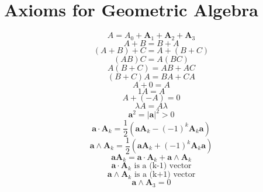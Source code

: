 \documentclass[11pt, a4paper, fleqn]{report}
\numberwithin{equation}{section}
\def\*#1{\mathbf{#1}}
\begin{document}
\section{Axioms for Geometric Algebra}
\begin{equation}
    A = A_0+\*A_1+\*A_2+\*A_3
\end{equation}
\begin{equation}
    A+B=B+A
\end{equation}
\begin{equation}
    (A+B)+C=A+(B+C)
\end{equation}
\begin{equation}
    (AB)C=A(BC)
\end{equation}
\begin{equation}
    A(B+C)=AB+AC
\end{equation}
\begin{equation}
    (B+C)A=BA+CA
\end{equation}
\begin{equation}
    A+0=A
\end{equation}
\begin{equation}
    1A=A
\end{equation}
\begin{equation}
    A+(-A)=0
\end{equation}
\begin{equation}
    \lambda A=A\lambda
\end{equation}
\begin{equation}
    \*a^2=|\*a|^2>0
\end{equation}
\begin{equation}\tag{1.7.12a}
    \*a\cdot\*A_k=\frac{1}{2}(\*a\*A_k-(-1)^k\*A_k\*a)
\end{equation}
\begin{equation}\tag{1.7.12b}
    \*a\wedge\*A_k=\frac{1}{2}(\*a\*A_k+(-1)^k\*A_k\*a)
\end{equation}
\begin{equation}\tag{1.7.12c}
    \*a\*A_k=\*a\cdot\*A_k+\*a\wedge\*A_k
\end{equation}
\begin{equation}\tag{1.7.13a}
    \*a\cdot\*A_k\textrm{ is a (k-1) vector}
\end{equation}
\begin{equation}\tag{1.7.13b}
    \*a\wedge\*A_k\textrm{ is a (k+1) vector}
\end{equation}
\begin{equation}\tag{1.7.14a}
    \*a\wedge\*A_3=0
\end{equation}
\end{document}

